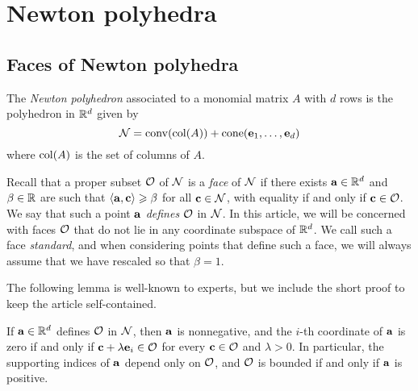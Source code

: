 \documentclass[11pt]{amsart}
\begin{document}
\newpage

\section{Newton polyhedra}
\label{newton-polyhedra: S}

\subsection{Faces of Newton polyhedra} The \emph{Newton polyhedron} associated to a monomial matrix $A$ with $d$ rows is the polyhedron in $\mathbb{R}^d$ given by 
\[ \mathcal{N} = \operatorname{conv}( \operatorname{col}(A) ) + \operatorname{cone}( \mathbf{e}_1, \ldots, \mathbf{e}_d) \] where $\operatorname{col}(A)$ is the set of columns of $A$.  

Recall that a proper  subset $\mathcal{O}$ of $\mathcal{N}$ is a \emph{face} of $\mathcal{N}$  if there exists $\mathbf{a} \in \mathbb{R}^d$ and $\beta \in \mathbb{R}$ are such that $\langle \mathbf{a}, \mathbf{c} \rangle \geqslant \beta$ for all $\mathbf{c} \in \mathcal{N}$, with equality if and only if $\mathbf{c} \in \mathcal{O}$.  We say that  such a point $\mathbf{a}$ \emph{defines} $\mathcal{O}$ in $\mathcal{N}$.    In this article, we will be concerned with faces $\mathcal{O}$ that do not lie in any coordinate subspace of $\mathbb{R}^d$.  We call such a face \emph{standard}, and when considering points that define such a face, we will always assume that we have rescaled so that $\beta = 1$. 

The following lemma is well-known to experts, but we include the short proof to keep the article self-contained.

\begin{lemma} 
\label{face: L}
If $\mathbf{a} \in \mathbb{R}^d$ defines $\mathcal{O}$ in $\mathcal{N}$, then $\mathbf{a}$ is nonnegative, and the $i$-th coordinate of $\mathbf{a}$ is zero if and only if $\mathbf{c} + \lambda \mathbf{e}_i \in \mathcal{O}$  for every $\mathbf{c} \in \mathcal{O}$ and $\lambda > 0$.  In particular, the supporting indices of $\mathbf{a}$ depend only on $\mathcal{O}$, and $\mathcal{O}$ is bounded if and only if $\mathbf{a}$ is positive. 
\end{lemma}
\end{document}
